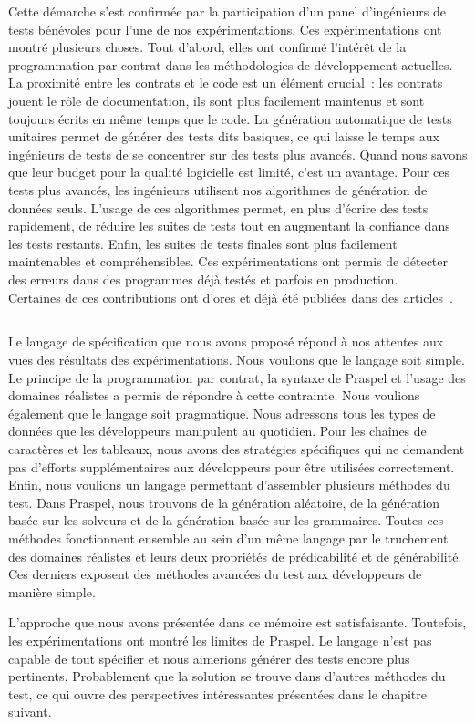 Cette démarche s'est confirmée par la participation d'un panel d'ingénieurs de
tests bénévoles pour l'une de nos expérimentations. Ces expérimentations ont
montré plusieurs choses. Tout d'abord, elles ont confirmé l'intérêt de la
programmation par contrat dans les méthodologies de développement actuelles. La
proximité entre les contrats et le code est un élément crucial~: les contrats
jouent le rôle de documentation, ils sont plus facilement maintenus et sont
toujours écrits en même temps que le code. La génération automatique de tests
unitaires permet de générer des tests dits basiques, ce qui laisse le temps aux
ingénieurs de tests de se concentrer sur des tests plus avancés. Quand nous
savons que leur budget pour la qualité logicielle est limité, c'est un avantage.
Pour ces tests plus avancés, les ingénieurs utilisent nos algorithmes de
génération de données seuls. L'usage de ces algorithmes permet, en plus d'écrire
des tests rapidement, de réduire les suites de tests tout en augmentant la
confiance dans les tests restants. Enfin, les suites de tests finales sont plus
facilement maintenables et compréhensibles. Ces expérimentations ont permis de
détecter des erreurs dans des programmes déjà testés et parfois en production.
\\

Certaines de ces contributions ont d'ores et déjà été publiées dans des
articles~.

\subsection{}
\label{subsection:conclusions:summa}

Le langage de spécification que nous avons proposé répond à nos attentes aux
vues des résultats des expérimentations. Nous voulions que le langage soit
simple. Le principe de la programmation par contrat, la syntaxe de Praspel et
l'usage des domaines réalistes a permis de répondre à cette contrainte. Nous
voulions également que le langage soit pragmatique. Nous adressons tous les
types de données que les développeurs manipulent au quotidien. Pour les chaînes
de caractères et les tableaux, nous avons des stratégies spécifiques qui ne
demandent pas d'efforts supplémentaires aux développeurs pour être utilisées
correctement. Enfin, nous voulions un langage permettant d'assembler plusieurs
méthodes du test. Dans Praspel, nous trouvons de la génération aléatoire, de la
génération basée sur les solveurs et de la génération basée sur les grammaires.
Toutes ces méthodes fonctionnent ensemble au sein d'un même langage par le
truchement des domaines réalistes et leurs deux propriétés de prédicabilité et
de générabilité.  Ces derniers exposent des méthodes avancées du test aux
développeurs de manière simple.

L'approche que nous avons présentée dans ce mémoire est satisfaisante.
Toutefois, les expérimentations ont montré les limites de Praspel. Le langage
n'est pas capable de tout spécifier et nous aimerions générer des tests encore
plus pertinents. Probablement que la solution se trouve dans d'autres méthodes
du test, ce qui ouvre des perspectives intéressantes présentées dans le chapitre
suivant.
